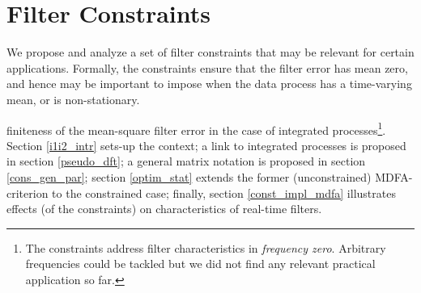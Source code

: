 \documentclass[a4paper]{book}
\def\pf{{\bf Proof. }}
\def\logimplies{\Rightarrow}
\def\convinlaw{\stackrel{{\cal L}}{\Longrightarrow }}
\def\convinp{\stackrel{P}{\longrightarrow }}
\def\convas{\stackrel{a.s.}{\longrightarrow }}
\def\convv{\stackrel{v}{\longrightarrow}}
\def\asymp{\stackrel{{\mathbb P}}{\sim}}
\def\RR{\mathbb R}
\def\ZZ{\mathbb Z}
\def\QQ{\mathbb Q}
\def\NN{\mathbb N}
\def\MM{\mathbb M}
\def\LL{\mathbb L}
\def\EE{\mathbb E}
\def\PP{\mathbb P}
\def\DD{\mathbb D}
\def\WW{\mathbb W}
\def\FF{\mathbb F}
\def\II{\mathbb I}
\def\FF{\mathbb F}
\begin{document}
 




\chapter{Filter Constraints}
\label{con_sec}

We propose and analyze a set of filter constraints that may be relevant for certain 
  applications. Formally, the constraints ensure 
  that the filter error has mean zero, and hence may be
   important to impose when the data process has a time-varying mean, or
    is non-stationary.
  
finiteness of the mean-square filter error in the case of integrated
 processes\footnote{The constraints address filter characteristics in 
\emph{frequency zero}. Arbitrary frequencies could be tackled but we did 
not find any relevant practical application so far.}. Section \ref{i1i2_intr} 
sets-up the context; a link to integrated processes is proposed in 
section \ref{pseudo_dft}; a general matrix notation is proposed in 
section \ref{cons_gen_par}; section \ref{optim_stat} extends the former 
(unconstrained) MDFA-criterion to the constrained case; finally, section 
\ref{const_impl_mdfa} illustrates effects (of the constraints) on 
characteristics of real-time filters.  \\




\def\pf{{\bf Proof. }}
\def\logimplies{\Rightarrow}
\def\convinlaw{\stackrel{{\cal L}}{\Longrightarrow }}
\def\convinp{\stackrel{P}{\longrightarrow }}
\def\convas{\stackrel{a.s.}{\longrightarrow }}
\def\convv{\stackrel{v}{\longrightarrow}}
\def\asymp{\stackrel{{\mathbb P}}{\sim}}
\def\RR{\mathbb R}
\def\ZZ{\mathbb Z}
\def\QQ{\mathbb Q}
\def\NN{\mathbb N}
\def\MM{\mathbb M}
\def\LL{\mathbb L}
\def\EE{\mathbb E}
\def\PP{\mathbb P}
\def\DD{\mathbb D}
\def\WW{\mathbb W}
\def\FF{\mathbb F}
\def\II{\mathbb I}
\def\FF{\mathbb F}
\def\ttheta{\widetilde{\theta}}
\def\tTheta{\widetilde{\Theta}}
\def\tsig{\widetilde{\sigma}^2}
\def\tc{\widetilde{c}}
\def\etheta{\widehat{\theta}}
\def\eTheta{\widehat{\Theta}}
\def\esig{\widehat{\sigma}^2}
\def\ptheta{\underline{\theta}}
\def\pTheta{\underline{\Theta}}
\def\psig{\underline{\sigma}^2}
\end{document}
